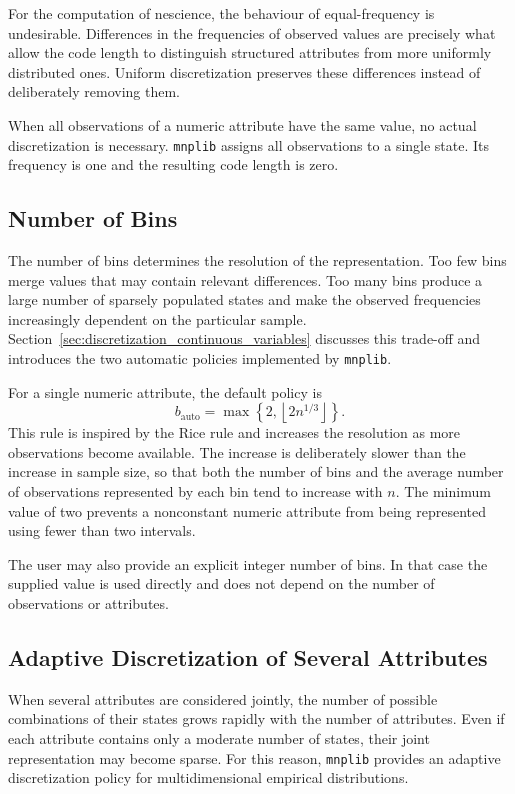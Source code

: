For the computation of nescience, the behaviour of equal-frequency is undesirable. Differences in the frequencies of observed values are precisely what allow the code length to distinguish structured attributes from more uniformly distributed ones. Uniform discretization preserves these differences instead of deliberately removing them.

When all observations of a numeric attribute have the same value, no actual discretization is necessary. \texttt{mnplib} assigns all observations to a single state. Its frequency is one and the resulting code length is zero.

\subsection*{Number of Bins}

The number of bins determines the resolution of the representation. Too few bins merge values that may contain relevant differences. Too many bins produce a large number of sparsely populated states and make the observed frequencies increasingly dependent on the particular sample. Section~\ref{sec:discretization_continuous_variables} discusses this trade-off and introduces the two automatic policies implemented by \texttt{mnplib}.

For a single numeric attribute, the default policy is
$$
b_{\mathrm{auto}} = \max \left\{2, \left \lfloor 2n^{1/3} \right \rfloor \right\}.
$$
This rule is inspired by the Rice rule and increases the resolution as more observations become available. The increase is deliberately slower than the increase in sample size, so that both the number of bins and the average number of observations represented by each bin tend to increase with $n$. The minimum value of two prevents a nonconstant numeric attribute from being represented using fewer than two intervals.

The user may also provide an explicit integer number of bins. In that case the supplied value is used directly and does not depend on the number of observations or attributes.

\subsection*{Adaptive Discretization of Several Attributes}

When several attributes are considered jointly, the number of possible combinations of their states grows rapidly with the number of attributes. Even if each attribute contains only a moderate number of states, their joint representation may become sparse. For this reason, \texttt{mnplib} provides an adaptive discretization policy for multidimensional empirical distributions.

